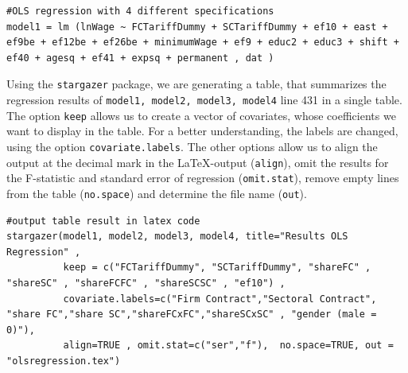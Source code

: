\lstset{firstnumber = 421}
\begin{lstlisting}
#OLS regression with 4 different specifications
model1 = lm (lnWage ~ FCTariffDummy + SCTariffDummy + ef10 + east + ef9be + ef12be + ef26be + minimumWage + ef9 + educ2 + educ3 + shift + ef40 + agesq + ef41 + expsq + permanent , dat )
\end{lstlisting}
Using the \texttt{stargazer} package, we are generating a table, that summarizes the regression results of \texttt{model1, model2, model3, model4} line 431 in a single table. The option \texttt{keep} allows us to create a vector of covariates, whose coefficients we want to display in the table. For a better understanding, the labels are changed, using the option \texttt{covariate.labels}. The other options allow us to align the output at the decimal mark in the \LaTeX -output (\texttt{align}), omit the results for the F-statistic and standard error of regression (\texttt{omit.stat}), remove empty lines from the table (\texttt{no.space}) and determine the file name (\texttt{out}).
\lstset{firstnumber = 430}
\begin{lstlisting}
#output table result in latex code
stargazer(model1, model2, model3, model4, title="Results OLS Regression" ,
          keep = c("FCTariffDummy", "SCTariffDummy", "shareFC" , "shareSC" , "shareFCFC" , "shareSCSC" , "ef10") ,
          covariate.labels=c("Firm Contract","Sectoral Contract", "share FC","share SC","shareFCxFC","shareSCxSC" , "gender (male = 0)"),
          align=TRUE , omit.stat=c("ser","f"),  no.space=TRUE, out = "olsregression.tex")
\end{lstlisting}
